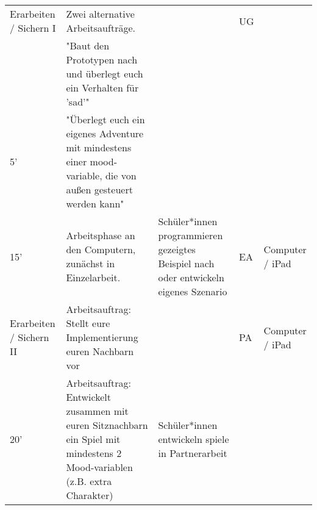 \documentclass{article}
\begin{document}
\begin{tabularx}{\textwidth}{|X|X|X|X|X|}
Erarbeiten / Sichern I           & Zwei alternative Arbeitsaufträge.                                                                                           &                                                                                      & UG                                                                                       &                                                                             \\
                                 & "Baut den Prototypen nach und überlegt euch ein Verhalten für 'sad'"                                                        &                                                                                      &                                                                                          &                                                                             \\
5'                               & "Überlegt euch ein eigenes Adventure mit mindestens einer mood-variable, die von außen gesteuert werden kann"               &                                                                                      &                                                                                          &                                                                             \\
15'                              & Arbeitsphase an den Computern, zunächst in Einzelarbeit.                                                                    & Schüler*innen programmieren gezeigtes Beispiel nach oder entwickeln eigenes Szenario & EA                                                                                       & Computer / iPad                                                             \\ \hline
Erarbeiten / Sichern II          & Arbeitsauftrag: Stellt eure Implementierung euren Nachbarn vor                                                              &                                                                                      & PA                                                                                       & Computer / iPad                                                             \\
20'                              & Arbeitsauftrag: Entwickelt zusammen mit euren Sitznachbarn ein Spiel mit mindestens 2 Mood-variablen (z.B. extra Charakter) & Schüler*innen entwickeln spiele in Partnerarbeit                                     &                                                                                          &                                                                             \\ \hline

\end{tabularx}
\end{document}
